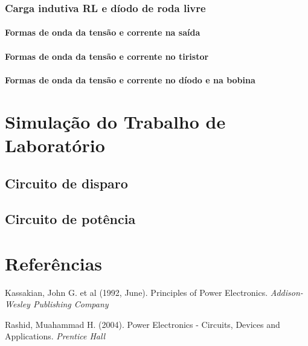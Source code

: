 \documentclass[a4paper,11pt]{article}
\numberwithin{equation}{section}
\begin{document}


\subsubsection{Carga indutiva RL e díodo de roda livre}

\paragraph{Formas de onda da tensão e corrente na saída}


\paragraph{Formas de onda da tensão e corrente no tiristor}


\paragraph{Formas de onda da tensão e corrente no díodo e na bobina}


\section{Simulação do Trabalho de Laboratório}


\subsection{Circuito de disparo}

\subsection{Circuito de potência}

\section{Referências}

Kassakian, John G. et al (1992, June). Principles of Power Electronics. \textit{Addison-Wesley Publishing Company}

Rashid, Muahammad H. (2004). Power Electronics - Circuits, Devices and Applications. \textit{Prentice Hall}

\pagebreak
\end{document}
